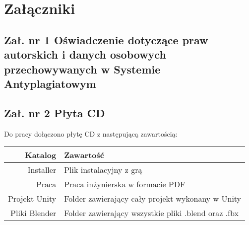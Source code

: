 \chapter*{Załączniki}
\section*{Zał. nr 1  Oświadczenie dotyczące praw autorskich i danych osobowych przechowywanych w Systemie Antyplagiatowym}

\section*{Zał. nr 2 Płyta CD}
\centering
Do pracy dołączono płytę CD z następującą zawartością: 
\hfill \break
\hfill \break
\begin{tabular}{|r|l|} \hline
Katalog & Zawartość \\ \hline
Installer & Plik instalacyjny z grą \\
Praca & Praca inżynierska w formacie PDF \\
Projekt Unity & Folder zawierający cały projekt wykonany w Unity \\
Pliki Blender & Folder zawierający wszystkie pliki .blend oraz .fbx \\ \hline

\end{tabular}




